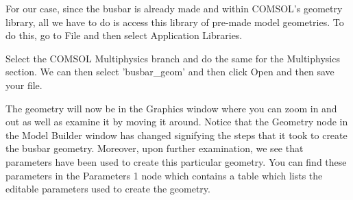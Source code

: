 For our case, since the busbar is already made and within COMSOL's geometry library, all we have to do is access this library of pre-made model geometries. To do this, go to File and then select Application Libraries.


Select the COMSOL Multiphysics branch and do the same for the Multiphysics section. We can then select 'busbar\_geom' and then click Open and then save your file.


The geometry will now be in the Graphics window where you can zoom in and out as well as examine it by moving it around. Notice that the Geometry node in the Model Builder window has changed signifying the steps that it took to create the busbar geometry. Moreover, upon further examination, we see that parameters have been used to create this particular geometry. You can find these parameters in the Parameters 1 node which contains a table which lists the editable parameters used to create the geometry.

